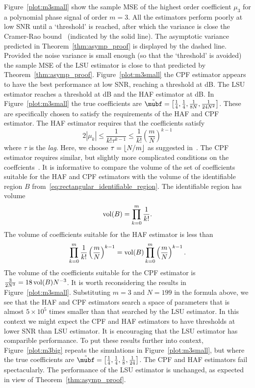 \documentclass[journal]{IEEEtran}
\begin{document}
Figure~\ref{plot:m3small} show the sample MSE of the highest order coefficient $\mu_3$ for a polynomial phase signal of order $m=3$.  All the estimators perform poorly at low SNR until a `threshold' is reached, after which the variance is close the Cramer-Rao bound~\cite{Peleg1991_CRB_PPS_1991} (indicated by the solid line).  The asymptotic variance predicted in Theorem~\ref{thm:asymp_proof} is displayed by the dashed line.  Provided the noise variance is small enough (so that the `threshold' is avoided) the sample MSE of the LSU estimator is close to that predicted by Theorem~\ref{thm:asymp_proof}.  Figure~\ref{plot:m3small} the CPF estimator appears to have the best performance at low SNR, reaching a threshold at \unit[1]{dB}.  The LSU estimator reaches a threshold at \unit[3]{dB} and the HAF estimator at \unit[5]{dB}.  In Figure~\ref{plot:m3small} the true coefficients are $\tilde{\mubf} = \left[ \tfrac{1}{4}, \tfrac{1}{4}, \tfrac{1}{8N}, \tfrac{1}{24N^2}  \right]$.  These are specifically chosen to satisfy the requirements of the HAF and CPF estimator.  The HAF estimator requires that the coefficients satisfy
\[
2|\mu_k| \leq \frac{1}{k! \tau^{k-1}} \leq \frac{1}{k!}\left( \frac{m}{N} \right)^{k-1}
\]
where $\tau$ is the \emph{lag}.  Here, we choose $\tau = {\left\lfloor N/m \right\rfloor}$ as suggested in~\cite{Peleg_DPT_1995}.  The CPF estimator requires similar, but slightly more complicated conditions on the coeffcients~\cite{Oshea_cpf_2004}.  It is informative to compare the volume of the set of coefficients suitable for the HAF and CPF estimators with the volume of the identifiable region $B$ from~\eqref{eq:rectangular_identifiable_region}. The identifiable region has volume 
\[
\operatorname{vol}(B) = \prod_{k=0}^m {\frac{1}{k!}}.
\]
The volume of coefficients suitable for the HAF estimator is less than
\[
\prod_{k=0}^m \frac{1}{k!}\left( \frac{m}{N} \right)^{k-1} = \operatorname{vol}(B) \prod_{k=0}^m \left( \frac{m}{N} \right)^{k-1}.
\]
The volume of the coefficients suitable for the CPF estimator is $\tfrac{3}{2N^3} = 18 \operatorname{vol}(B) N^{-3}$.  It is worth reconsidering the results in Figure~\ref{plot:m3small}.  Substituting $m=3$ and $N=199$ in the formula above, we see that the HAF and CPF estimators search a space of parameters that is almost $5 \times 10^5$ times smaller than that searched by the LSU estimator.  In this context we might expect the CPF and HAF estimators to have thresholds at lower SNR than LSU estimator.  It is encouraging that the LSU estimator has comparible performance.  To put these results further into context, Figure~\ref{plot:m3big} repeats the simulations in Figure~\ref{plot:m3small}, but where the true coefficients are $\tilde{\mubf} = \left[ \tfrac{1}{4}, \tfrac{1}{4}, \tfrac{1}{8}, \tfrac{1}{24}  \right]$.  The CPF and HAF estimators fail spectacularly.  The performance of the LSU estimator is unchanged, as expected in view of Theorem~\ref{thm:asymp_proof}.
\end{document}
